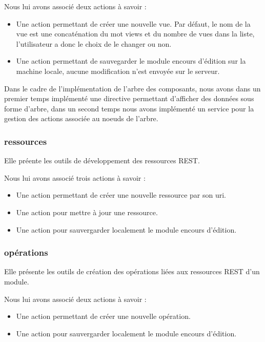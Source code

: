 \documentclass[a4paper,11pt]{report}
\begin{document}
Nous lui avons associé deux actions à savoir :

\begin{itemize}
 \item Une action permettant de créer une nouvelle vue. Par défaut, le nom de la vue est une concaténation du mot \og views \fg et du nombre de 
	  vues dans la liste, l'utilisateur a donc le choix de le changer ou non.
\item Une action permettant de sauvegarder le module encours d'édition sur la machine locale, aucune modification n'est envoyée sur le serveur.
\end{itemize}

Dans le cadre de l'implémentation de l'arbre des composants, nous avons dans un premier temps implémenté une directive permettant d'afficher
des données sous forme d'arbre, dans un second temps nous avons implémenté un service pour la gestion des actions associée au noeuds de l'arbre.

\subsubsection{ressources}

Elle préente les outils de développement des ressources REST.

Nous lui avons associé trois actions à savoir :

\begin{itemize}
 \item Une action permettant de créer une nouvelle ressource par son uri.
 \item Une action pour mettre à jour une ressource.
 \item Une action pour sauvergarder localement le module encours d'édition.
\end{itemize}

\subsubsection{opérations}

Elle présente les outils de création des opérations liées aux ressources REST d'un module.

Nous lui avons associé deux actions  à savoir :

\begin{itemize}
 \item Une action permettant de créer une nouvelle opération.
 \item Une action pour sauvergarder localement le module encours d'édition.
\end{itemize}
\end{document}
